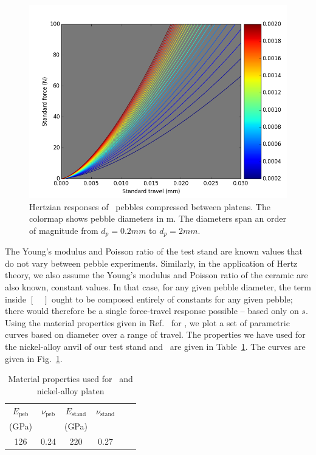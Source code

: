 \begin{figure}[!t]
\centering
\includegraphics[width = \singleimagewidth]{chapters/figures/hertz-dp-dependence}
\caption{Hertzian responses of \lit~pebbles compressed between platens. The colormap shows pebble diameters in \si{m}. The diameters span an order of magnitude from $d_p = \si{0.2 mm}$ to $d_p = \si{2 mm}$.}\label{fig:hertz-dp-dependence}
\end{figure}







The Young's modulus and Poisson ratio of the test stand are known values that do not vary between pebble experiments. Similarly, in the application of Hertz theory, we also assume the Young's modulus and Poisson ratio of the ceramic are also known, constant values. In that case, for any given pebble diameter, the term inside $[\quad]$ ought to be composed entirely of constants for any given pebble; there would therefore be a single force-travel response possible -- based only on $s$. Using the material properties given in Ref.~\cite{Gierszewski1998} for \lit, we plot a set of parametric curves based on diameter over a range of travel. The properties we have used for the nickel-alloy anvil of our test stand and \lit~are given in Table~\ref{tab:hertz-dp-study-props}. The curves are given in Fig.~\ref{fig:hertz-dp-dependence}.

\begin {table}[htp] %
\caption{Material properties used for \lit~and nickel-alloy platen}
\label {tab:hertz-dp-study-props} \centering %
\begin {tabular}{ cccccc }
\toprule %
$E_\text{peb}$      &     $\nu_\text{peb}$  &   $E_\text{stand}$        &     $\nu_\text{stand}$    \\
(GPa)           &                   &   (GPa)               &                   \\\toprule
126             &   0.24                &   220                 &   0.27                \\\bottomrule
\end{tabular}
\end{table}

